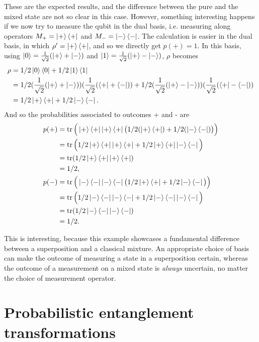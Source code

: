 These are the expected results, and the difference between the pure and the mixed state are not so clear in this case. However, something interesting happens if we now try to measure the qubit in the dual basis, i.e. measuring along operators $M_+ = \ket{+}\bra{+}$ and $M_- = \ket{-}\bra{-}$. The calculation is easier in the dual basis, in which $\rho' = \ket{+}\bra{+}$, and so we directly get $p(+) = 1$. In this basis, using $\ket{0} = \frac{1}{\sqrt{2}}(\ket{+} + \ket{-})$ and $\ket{1} = \frac{1}{\sqrt{2}}(\ket{+} - \ket{-})$, $\rho$ becomes
\begin{align}
    \rho &= 1/2 \ket{0}\bra{0} + 1/2 \ket{1}\bra{1}\\
               &= 1/2 (\frac{1}{\sqrt{2}}(\ket{+} + \ket{-}))(\frac{1}{\sqrt{2}}(\bra{+} + \bra{-})) + 1/2 (\frac{1}{\sqrt{2}}(\ket{+} - \ket{-}))(\frac{1}{\sqrt{2}}(\bra{+} - \bra{-}))\\
               &= 1/2 \ket{+}\bra{+} + 1/2 \ket{-}\bra{-}.
\end{align}
\noindent And so the probabilities associated to outcomes + and - are
\begin{align}
    p(+) &= \operatorname{tr}\Big(\ket{+}\bra{+}\ket{+}\bra{+}\big(1/2 (\ket{+}\bra{+}) + 1/2 (\ket{-}\bra{-})\big)\Big)\\
         &= \operatorname{tr}\Big(1/2 \ket{+}\bra{+}\ket{+}\bra{+} + 1/2 \ket{+}\bra{+}\ket{-}\bra{-}\Big)\\
         &= \operatorname{tr}(1/2 \ket{+}\bra{+}\ket{+}\bra{+})\\
         &= 1/2,\\
    p(-) &= \operatorname{tr}\Big(\ket{-}\bra{-}\ket{-}\bra{-}\big(1/2 \ket{+}\bra{+} + 1/2 \ket{-}\bra{-}\big)\Big)\\
         &= \operatorname{tr}\Big(1/2 \ket{-}\bra{-}\ket{-}\bra{-} + 1/2 \ket{-}\bra{-}\ket{-}\bra{-}\Big)\\
         &= \operatorname{tr}(1/2 \ket{-}\bra{-}\ket{-}\bra{-})\\
         &= 1/2.
\end{align}

This is interesting, because this example showcases a fundamental difference between a superposition and a classical mixture. An appropriate choice of basis can make the outcome of measuring a state in a superposition certain, whereas the outcome of a measurement on a mixed state is \textit{always} uncertain, no matter the choice of measurement operator.



\newpage

\section{Probabilistic entanglement transformations} \label{app:vidal}

